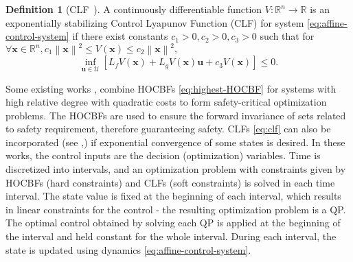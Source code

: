 \documentclass[letterpaper, 10 pt, conference]{ieeeconf}
\theoremstyle{definition}
\newtheorem{definition}{Definition}
\begin{document}
\begin{definition}[CLF~\cite{ames2012control}]
\label{def:control-l-f}
A continuously differentiable function $V:\mathbb{R}^{n}\to\mathbb{R}$ is an exponentially stabilizing Control Lyapunov Function (CLF) for system \eqref{eq:affine-control-system} if there exist constants $c_{1}>0, c_{2}>0,c_{3}>0$ such that for $\forall \boldsymbol{x} \in \mathbb{R}^{n}, c_{1}\left \|  \boldsymbol{x} \right \| ^{2} \le V(\boldsymbol{x}) \le c_{2}\left \|  \boldsymbol{x} \right \| ^{2},$
\begin{equation}
\label{eq:clf}
\inf_{\boldsymbol{u}\in \mathcal U}[L_{f}V(\boldsymbol{x})+L_{g}V(\boldsymbol{x})\boldsymbol{u}+c_{3}V(\boldsymbol{x})]\le 0.
\end{equation}
\end{definition}

 Some existing works \cite{nguyen2016exponential},\cite{xiao2021high} combine HOCBFs \eqref{eq:highest-HOCBF} for systems with high relative degree with quadratic costs to form safety-critical optimization problems. The HOCBFs are used to ensure the forward invariance of sets related to safety requirement, therefore guaranteeing safety.
CLFs \eqref{eq:clf} can also be incorporated (see \cite{xiao2021high},\cite{xiao2021adaptive}) if exponential convergence of some states is desired. In these works, the control inputs are the decision (optimization) variables. Time is discretized into intervals, and an optimization problem with constraints given by HOCBFs (hard constraints) and CLFs (soft constraints) is solved in each
time interval. The state value is fixed
at the beginning of each interval, which results in linear constraints for the control - the resulting 
optimization problem is a QP. The optimal control obtained by solving each QP is applied at the beginning of the interval and held constant for the
whole interval. During each interval, the state is updated using dynamics \eqref{eq:affine-control-system}. 
\end{document}

